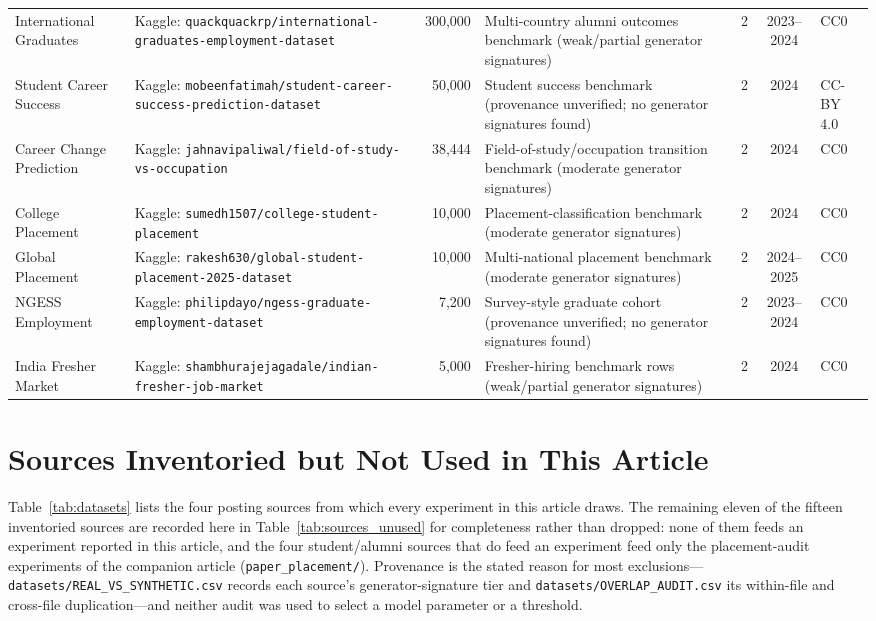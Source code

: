 \documentclass[journal]{IEEEtran}
\begin{document}
\begin{table}[!t]
\begin{tabular}{@{}p{2.3cm}p{3.8cm}rp{5.4cm}ccp{1.2cm}@{}}
\addlinespace[1pt]
International Graduates \cite{quackquackrp2024international} & Kaggle: \nolinkurl{quackquackrp/international-graduates-employment-dataset} & 300,000 & Multi-country alumni outcomes benchmark (weak/partial generator signatures) & 2 & 2023--2024 & CC0 \\
\addlinespace[2pt]
Student Career Success \cite{mobeenfatimah2024career} & Kaggle: \nolinkurl{mobeenfatimah/student-career-success-prediction-dataset} & 50,000 & Student success benchmark (provenance unverified; no generator signatures found) & 2 & 2024 & CC-BY 4.0 \\
\addlinespace[2pt]
Career Change Prediction \cite{jahnavipaliwal2024field} & Kaggle: \nolinkurl{jahnavipaliwal/field-of-study-vs-occupation} & 38,444 & Field-of-study/occupation transition benchmark (moderate generator signatures) & 2 & 2024 & CC0 \\
\addlinespace[2pt]
College Placement \cite{sumedh15072024college} & Kaggle: \nolinkurl{sumedh1507/college-student-placement} & 10,000 & Placement-classification benchmark (moderate generator signatures) & 2 & 2024 & CC0 \\
\addlinespace[2pt]
Global Placement \cite{rakesh6302024global} & Kaggle: \nolinkurl{rakesh630/global-student-placement-2025-dataset} & 10,000 & Multi-national placement benchmark (moderate generator signatures) & 2 & 2024--2025 & CC0 \\
\addlinespace[2pt]
NGESS Employment \cite{philipdayo2024ngess} & Kaggle: \nolinkurl{philipdayo/ngess-graduate-employment-dataset} & 7,200 & Survey-style graduate cohort (provenance unverified; no generator signatures found) & 2 & 2023--2024 & CC0 \\
\addlinespace[2pt]
India Fresher Market \cite{shambhurajejagadale2024india} & Kaggle: \nolinkurl{shambhurajejagadale/indian-fresher-job-market} & 5,000 & Fresher-hiring benchmark rows (weak/partial generator signatures) & 2 & 2024 & CC0 \\
\bottomrule
\end{tabular}
\end{table}

\section{Sources Inventoried but Not Used in This Article}
\label{app:sources}

Table~\ref{tab:datasets} lists the four posting sources from which every experiment in this article draws. The remaining eleven of the fifteen inventoried sources are recorded here in Table~\ref{tab:sources_unused} for completeness rather than dropped: none of them feeds an experiment reported in this article, and the four student/alumni sources that do feed an experiment feed only the placement-audit experiments of the companion article (\texttt{paper\_placement/}). Provenance is the stated reason for most exclusions---\texttt{datasets/REAL\_VS\_SYNTHETIC.csv} records each source's generator-signature tier and \texttt{datasets/OVERLAP\_AUDIT.csv} its within-file and cross-file duplication---and neither audit was used to select a model parameter or a threshold.

\clearpage
\balance


\end{document}
